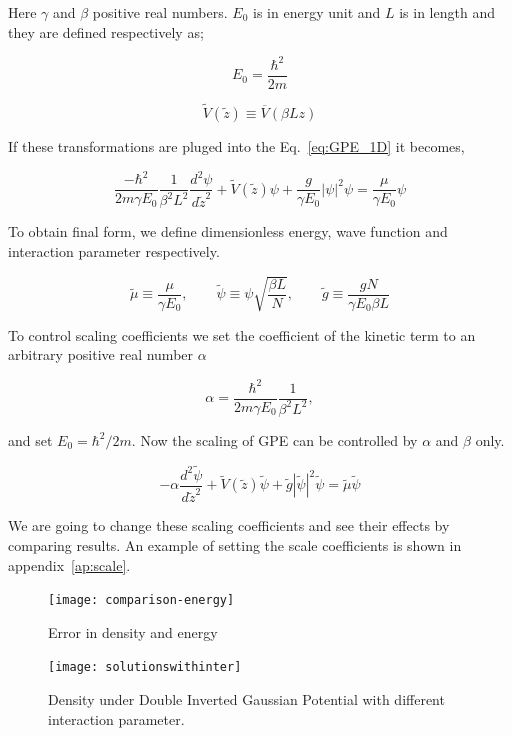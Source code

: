 \documentclass[a4paper,times,hidelinks,12pt]{article}
\begin{document}
Here $\gamma$ and $\beta$ positive real numbers. $E_0$ is in energy unit and $L$ is in length and they are defined respectively as;

$$E_0 = \frac{\hbar^2}{2m} $$


$$ \widetilde{V}(\widetilde{z}) \equiv \overline{V}(\beta L z) $$ 

If these transformations are pluged into the Eq.~\eqref{eq:GPE_1D} it becomes,

\begin{equation}
    \label{eq:GPE_1D_dimensionless_en_len}
    \frac{-\hbar^2}{2m\gamma E_0} \frac{1}{\beta^2 L^2}  \frac{d^2\psi}{d \widetilde{z}^2} + \widetilde{V}(\widetilde{z})\psi + \frac{g}{\gamma E_0}|\psi|^2\psi = \frac{\mu}{\gamma E_0}\psi
\end{equation}

To obtain final form, we define dimensionless energy, wave function and interaction parameter respectively. 

$$\widetilde{\mu} \equiv \frac{\mu}{\gamma E_0}, \qquad \widetilde{\psi} \equiv \psi{\sqrt{\frac{\beta L}{N}}}, \qquad \widetilde{g} \equiv \frac{gN}{\gamma E_0 \beta L} $$

To control scaling coefficients we set the coefficient of the kinetic term to an arbitrary positive real number $\alpha$  

$$ \alpha = \frac{\hbar^2}{2m\gamma E_0} \frac{1}{\beta^2 L^2} , $$

and set $E_0 = \hbar^2 / 2m$. Now the scaling of GPE can be controlled by $\alpha$ and $\beta$ only.

\begin{equation}
\label{eq:GPE_dimensionless}
    -\alpha\frac{d^2\widetilde{\psi}}{d\widetilde{z}^2} + \widetilde{V}(\widetilde{z})\widetilde{\psi} + \widetilde{g}|\widetilde{\psi}|^2 \widetilde{\psi} = \widetilde{\mu} \widetilde{\psi}
\end{equation}
    
We are going to change these scaling coefficients and see their effects by comparing results. An example of setting the scale coefficients is shown in appendix~\ref{ap:scale}.



\graphicspath{{"../figs/numericanalyze/"}}
\begin{figure}[H]
\centering
    \texttt{[image: comparison-energy]}
\caption{Error in density and energy}
\label{fig:dens_energy_error}
\end{figure}


\graphicspath{{"../figs/potentials/"}}
\begin{figure}[H]
    \texttt{[image: solutionswithinter]}
    \caption{Density under Double Inverted Gaussian Potential with different interaction parameter.}
\label{fig:gaussian_pot_and_density}
\end{figure}
\end{document}
